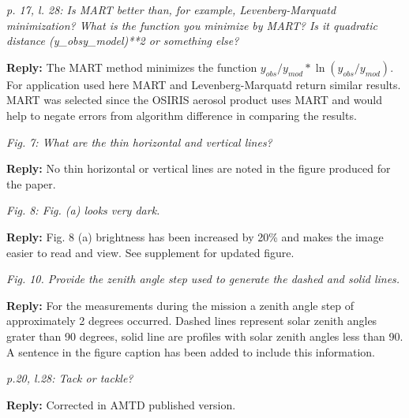 \documentclass[12pt, notitlepage]{article}
\begin{document}
\textit{p. 17, l. 28: Is MART better than, for example, Levenberg-Marquatd minimization?
What is the function you minimize by MART? Is it quadratic distance (y\_obsy\_model)**2
or something else?}

\textbf{Reply:} The MART method minimizes the function $y_{obs}/y_{mod}*\ln(y_{obs}/y_{mod})$. For application
used here MART and Levenberg-Marquatd return similar results. MART was selected since the OSIRIS aerosol
product uses MART and would help to negate errors from algorithm difference in comparing the results.

\hrulefill

\textit{Fig. 7: What are the thin horizontal and vertical lines?}

\textbf{Reply:} No thin horizontal or vertical lines are noted in the figure produced for the paper.

\hrulefill

\textit{Fig. 8: Fig. (a) looks very dark.}

\textbf{Reply:} Fig. 8 (a) brightness has been increased by 20\% and makes the image easier to read and view. See supplement for updated figure.

\hrulefill

\textit{Fig. 10. Provide the zenith angle step used to generate the dashed and solid lines.}

\textbf{Reply:} For the measurements during the mission a zenith angle step of approximately 2 degrees occurred.
Dashed lines represent solar zenith angles grater than 90 degrees, solid line are profiles with solar zenith angles less than 90.
A sentence in the figure caption has been added to include this information.

\hrulefill

\textit{p.20, l.28: Tack or tackle?}

\textbf{Reply:} Corrected in AMTD published version.

\hrulefill
\end{document}

